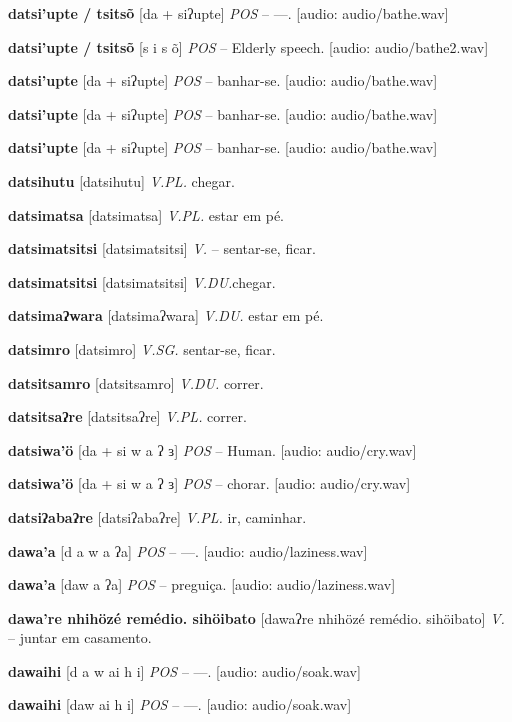\textbf{datsi'upte / tsitsõ} [da + siʔupte] \textit{POS} -- —. [audio: audio/bathe.wav]{\faHeadphones}

\textbf{datsi'upte / tsitsõ} [s i s õ] \textit{POS} -- Elderly speech. [audio: audio/bathe2.wav]{\faHeadphones}

\textbf{datsi'upte } [da + siʔupte] \textit{POS} -- banhar-se. [audio: audio/bathe.wav]{\faHeadphones}

\textbf{datsi'upte} [da + siʔupte] \textit{POS} -- banhar-se. [audio: audio/bathe.wav]{\faHeadphones}

\textbf{datsi'upte} [da + siʔupte] \textit{POS} -- banhar-se. [audio: audio/bathe.wav]{\faHeadphones}

\textbf{datsihutu} [datsihutu] \textit{V.PL.} chegar.

\textbf{datsimatsa} [datsimatsa] \textit{V.PL.} estar em pé.

\textbf{datsimatsitsi} [datsimatsitsi] \textit{V.} -- sentar-se, ficar.

\textbf{datsimatsitsi} [datsimatsitsi] \textit{V.DU.}chegar.

\textbf{datsimaʔwara} [datsimaʔwara] \textit{V.DU.} estar em pé.

\textbf{datsimro} [datsimro] \textit{V.SG.} sentar-se, ficar.

\textbf{datsitsamro} [datsitsamro] \textit{V.DU.} correr.

\textbf{datsitsaʔre} [datsitsaʔre] \textit{V.PL.} correr.

\textbf{datsiwa'ö} [da + si w a ʔ ɜ] \textit{POS} -- Human. [audio: audio/cry.wav]{\faHeadphones}

\textbf{datsiwa'ö} [da + si w a ʔ ɜ] \textit{POS} -- chorar. [audio: audio/cry.wav]{\faHeadphones}

\textbf{datsiʔabaʔre} [datsiʔabaʔre] \textit{V.PL.} ir, caminhar.

\textbf{dawa'a} [d a w a ʔa] \textit{POS} -- —. [audio: audio/laziness.wav]{\faHeadphones}

\textbf{dawa'a} [daw a ʔa] \textit{POS} -- preguiça. [audio: audio/laziness.wav]{\faHeadphones}

\textbf{dawa're nhihözé remédio. sihöibato} [dawaʔre nhihözé remédio. sihöibato] \textit{V.} -- juntar em casamento.

\textbf{dawaihi} [d a w ai h i] \textit{POS} -- —. [audio: audio/soak.wav]{\faHeadphones}

\textbf{dawaihi} [daw ai h i] \textit{POS} -- —. [audio: audio/soak.wav]{\faHeadphones}

